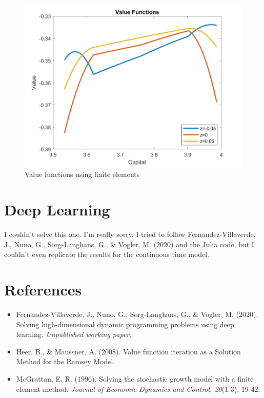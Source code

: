 \documentclass[a4paper,12pt]{article}
\begin{document}
     \begin{figure}[!htbp]
       \centering
       \includegraphics{econ714_homework2_question6_plot_value_functions.png}
       \caption{Value functions using finite elements}
       \label{finite_elements}
   \end{figure}
    
    \section{Deep Learning}
    
    I couldn't solve this one. I'm really sorry. I tried to follow Fernandez-Villaverde, J., Nuno, G., Sorg-Langhans, G., \& Vogler, M. (2020) and the Julia code, but I couldn't even replicate the results for the continuous time model. 
    
    \pagebreak
    \section*{References}
    
    \begin{itemize}
        \item Fernandez-Villaverde, J., Nuno, G., Sorg-Langhans, G., \& Vogler, M. (2020). Solving high-dimensional dynamic programming problems using deep learning. \textit{Unpublished working paper}.
        
        \item Heer, B., \& Maussner, A. (2008). Value function iteration as a Solution Method for the Ramsey Model.
        
        \item McGrattan, E. R. (1996). Solving the stochastic growth model with a finite element method. \textit{Journal of Economic Dynamics and Control, 20}(1-3), 19-42.
    \end{itemize}
    
\end{document}

